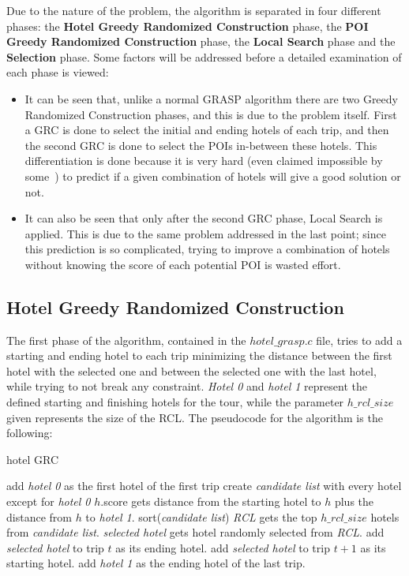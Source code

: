 Due to the nature of the problem, the algorithm is separated in four different phases: the \textbf{Hotel Greedy Randomized Construction} phase, the \textbf{POI Greedy Randomized Construction} phase, the \textbf{Local Search} phase and the \textbf{Selection} phase. Some factors will be addressed before a detailed examination of each phase is viewed:
\begin{itemize}
    \item It can be seen that, unlike a normal GRASP algorithm there are two Greedy Randomized Construction phases, and this is due to the problem itself. First a GRC is done to select the initial and ending hotels of each trip, and then the second GRC is done to select the POIs in-between these hotels. This differentiation is done because it is very hard (even claimed impossible by some~\cite{divsalar2014}) to predict if a given combination of hotels will give a good solution or not.
    
    \item It can also be seen that only after the second GRC phase, Local Search is applied. This is due to the same problem addressed in the last point; since this prediction is so complicated, trying to improve a combination of hotels without knowing the score of each potential POI is wasted effort.
\end{itemize}

\subsection{Hotel Greedy Randomized Construction}
The first phase of the algorithm, contained in the $hotel\_grasp.c$ file, tries to add a starting and ending hotel to each trip minimizing the distance between the first hotel with the selected one and between the selected one with the last hotel, while trying to not break any constraint. \textit{Hotel 0} and \textit{hotel 1} represent the defined starting and finishing hotels for the tour, while the parameter $h\_rcl\_size$ given represents the size of the RCL. The pseudocode for the algorithm is the following:

\begin{algorithm}
\caption{hotel GRC}\label{euclid}
\begin{algorithmic}[1]
\State add \textit{hotel 0} as the first hotel of the first trip
\State create \textit{candidate list} with every hotel except for \textit{hotel 0}
\State $h$.score gets distance from the starting hotel to $h$ plus the distance from $h$ to \textit{hotel 1}.
\EndFor
\State sort(\textit{candidate list})
\State \textit{RCL} gets the top $h\_rcl\_size$ hotels from \textit{candidate list}.
\State \textit{selected hotel} gets hotel randomly selected from \textit{RCL}.
\State add \textit{selected hotel} to trip $t$ as its ending hotel.
\State add \textit{selected hotel} to trip $t+1$ as its starting hotel.
\EndFor
\State add \textit{hotel 1} as the ending hotel of the last trip.
\end{algorithmic}
\end{algorithm}


